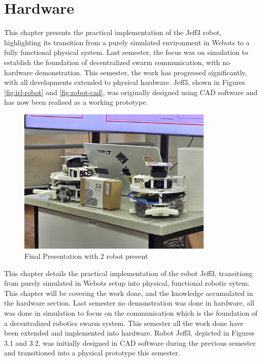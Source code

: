 \chapter{Hardware}
This chapter presents the practical implementation of the Jeff3 robot, highlighting its transition from a purely simulated environment in Webots to a fully functional physical system. Last semester, the focus was on simulation to establish the foundation of decentralized swarm communication, with no hardware demonstration. This semester, the work has progressed significantly, with all developments extended to physical hardware. Jeff3, shown in Figures \ref*{fig:irl-robot} and \ref*{fig:robot-cad}, was originally designed using CAD software and has now been realised as a working prototype.
\begin{figure} [H]
    \centering
    \includegraphics[height=7cm]{assets/images/hardware/irl-2-robots.jpeg}
    \caption{Final Presentation with 2 robot present}
    \label{fig:2-robot-present}
\end{figure}
This chapter details the practical implementation of the robot Jeff3, transitiong from purely simulated in Webots setup into physical, functional robotic sytem.
This chapter will be covering the work done, and the knowledge accumulated in the hardware section. Last semester no demonstration was done in hardware, all was done in simulation to focus on the communication which is the foundation of a decentralized robotics swarm system. This semester all the work done have been extended and implemented into hardware. Robot Jeff3, depicted in Figures 3.1 and 3.2, was initially designed in CAD software during the previous semester and transitioned into a physical prototype this semester.

